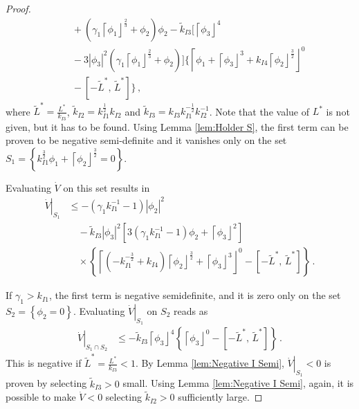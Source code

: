 \documentclass[journal,twoside,web]{ieeecolor}
\newcommand{\Sabs}[1]{\left\lceil #1 \right\rfloor}
\newcommand{\abs}[1]{\left| #1 \right|}
\newcommand{\conjunto}[1]{\left\{ #1 \right\} }
\newcommand{\Subsin}[1]{\left. #1 \right|}
\begin{document}
\begin{proof}
{\begin{align*}
 &\quad + \left(\gamma_{1}\Sabs{\phi_{1}}^{\frac{2}{3}}+\phi_{2}\right)\phi_{2}-\tilde{k}_{I3}\Big[\Sabs{\phi_{3}}^{4} \\
 &\quad -3\abs{\phi_{3}}^{2}\left(\gamma_{1}\Sabs{\phi_{1}}^{\frac{2}{3}}+\phi_{2}\right)\Big]\Bigg\{ \Sabs{\phi_{1}+\Sabs{\phi_{3}}^{3}+k_{I4}\Sabs{\phi_{2}}^{\frac{3}{2}}}^{0}\\
 &\quad -\left[-\tilde{L}^{*},\,\tilde{L}^{*}\right]\Bigg\} \,,
\end{align*}}
where $\tilde{L}^{*}=\frac{L^{*}}{k_{I3}}$, $\tilde{k}_{I2}=k_{I1}^{\frac{1}{2}}k_{I2}$
and $\tilde{k}_{I3}=k_{I3}k_{I1}^{-\frac{1}{2}}k_{I2}^{-1}$. Note that the value of $L^{*}$ is not given, but it has to be found. Using Lemma \ref{lem:Holder S}, the first term can be proven to be negative semi-definite and it vanishes only on the set $S_{1}=\conjunto{k_{I1}^{\frac{3}{2}}\phi_{1}+\Sabs{\phi_{2}}^{\frac{3}{2}}=0}$.

Evaluating $\dot{V}$ on this set results in
{\small
\begin{align*}
\Subsin{\dot{V}}_{S_{1}}  &\leq-\left(\gamma_{1}k_{I1}^{-1}-1\right)\left|\phi_{2}\right|^{2}\\
&\quad -\tilde{k}_{I3}\abs{\phi_{3}}^{2}\left[3\left(\gamma_{1}k_{I1}^{-1}-1\right)\phi_{2}+\Sabs{\phi_{3}}^{2}\right] \\
&\quad \times \left\{ \Sabs{\left(-k_{I1}^{-\frac{3}{2}}+k_{I4}\right)\Sabs{\phi_{2}}^{\frac{3}{2}}+\Sabs{\phi_{3}}^{3}}^{0}-\left[-\tilde{L}^{*},\,\tilde{L}^{*}\right]\right\} \,.
\end{align*}}

If $\gamma_{1}>k_{I1}$, the first term is negative semidefinite, and it is zero only on the set $S_{2}=\conjunto{\phi_{2}=0}$. Evaluating $\Subsin{\dot{V}}_{S_{1}}$ on $S_{2}$ reads as 
\begin{align*}
\Subsin{\dot{V}}_{S_{1}\cap S_{2}} & \leq-\tilde{k}_{I3}\Sabs{\phi_{3}}^{4}\left\{ \Sabs{\phi_{3}}^{0}-\left[-\tilde{L}^{*},\,\tilde{L}^{*}\right]\right\} \,.
\end{align*}
This is negative if $\tilde{L}^{*}=\frac{L^{*}}{k_{I3}}<1$. By Lemma \ref{lem:Negative I Semi}, $\Subsin{\dot{V}}_{S_{1}}<0$ is proven by selecting $\tilde{k}_{I3}>0$ small. Using Lemma \ref{lem:Negative I Semi}, again, it is possible to make $\dot{V}<0$ selecting $\tilde{k}_{I2}>0$ sufficiently large.


\end{proof}
\end{document}
